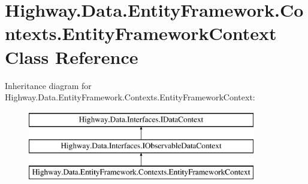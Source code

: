 \hypertarget{class_highway_1_1_data_1_1_entity_framework_1_1_contexts_1_1_entity_framework_context}{\section{Highway.\-Data.\-Entity\-Framework.\-Contexts.\-Entity\-Framework\-Context Class Reference}
\label{class_highway_1_1_data_1_1_entity_framework_1_1_contexts_1_1_entity_framework_context}
}
Inheritance diagram for Highway.\-Data.\-Entity\-Framework.\-Contexts.\-Entity\-Framework\-Context\-:\begin{figure}[H]
\begin{center}
\leavevmode
\includegraphics[height=3.000000cm]{class_highway_1_1_data_1_1_entity_framework_1_1_contexts_1_1_entity_framework_context}
\end{center}
\end{figure}
